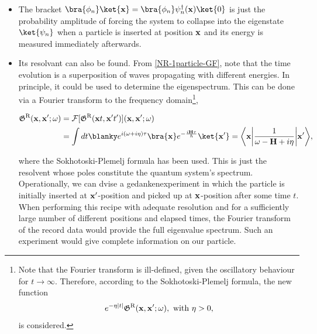 \begin{itemize}
    \item The bracket $\bra{\phi_n}\ket{{\bf x}} = \bra{\phi_n} \psi_n^\dagger({\bf x}) \ket{0}$ is just the probability amplitude of forcing the system to collapse into the eigenstate $\ket{\psi_n}$ when a particle is inserted at position ${\bf x}$ and its energy is measured immediately afterwards. \\
    \item Its resolvant can also be found. From \cref{NR-1particle-GF}, note that the time evolution is a superposition of waves propagating with different energies. In principle, it could be used to determine the eigenspectrum. This can be done via a Fourier transform to the frequency domain\footnote{Note that the Fourier transform is ill-defined, given the oscillatory behaviour for $t \rightarrow \infty$. Therefore, according to the Sokhotoski-Plemelj formula, the new function
        $$
            e^{-\eta |t| }\mathfrak{G}^{\textnormal{R}}({\bf x}, {\bf x}'; \omega), \textnormal{ with } \eta > 0,
        $$
        is considered.},
    
    \begin{equation}
    \begin{split}
        \mathfrak{G}^{\textnormal{R}}({\bf x}, {\bf x}'; \omega) &= \mathcal{F}[        \mathfrak{G}^{\textnormal{R}}({\bf x}t, {\bf x}'t')]({\bf x}, {\bf x}'; \omega) \\
        &= \int dt \blanky e^{i(\omega + i \eta) \tau} \bra{{\bf x}} e^{-\frac{i {\bf H} \tau}{\hbar}} \ket{{\bf x}'} = \bigg\langle {\bf x} \bigg| \frac{1}{\omega - {\bf H} + i \eta} \bigg| {{\bf x}'}\bigg\rangle,
    \end{split}
    \end{equation}
    
    where the Sokhotoski-Plemelj formula has been used. This is just the resolvent whose poles constitute the quantum system's spectrum. \\
    
    Operationally, we can dvise a gedankenexperiment in which the particle is initially inserted at ${\bf x}'$-position and picked up at ${\bf x}$-position after some time $t$. When performing this recipe with adequate resolution and for a sufficiently large number of different positions and elapsed times, the Fourier transform of the record data would provide the full eigenvalue spectrum. Such an experiment would give complete information on our particle. 
\end{itemize}

